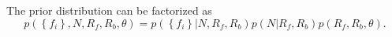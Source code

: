 \documentclass[aps,prd]{revtex4-1}
\newcommand{\mathset}[1]{\left\{ #1 \right\}}
\newcommand{\ilya}[1]{{\color{red} \bf #1}}
\begin{document}
%

The prior distribution can be factorized as
\begin{equation}
  \label{eq:combined-flag-rate-prior}
  p\left(\mathset{f_i}, N, R_f, R_b, \theta\right)  = 
  p\left( \mathset{f_i} | N, R_f, R_b\right) p\left(N |R_f, R_b\right)  
 p\left(R_f, R_b, \theta\right).
 \end{equation}
 
\end{document}
